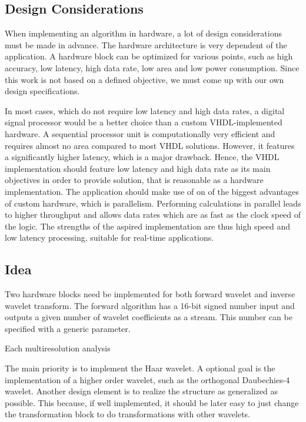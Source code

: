 \begin{refsection}
\subsection{Design Considerations}

When implementing an algorithm in hardware, a lot of design considerations must be made in advance.
The hardware architecture is very dependent of the application.
A hardware block can be optimized for various points, such as high accuracy, low latency, high data rate, low area and low power consumption.
Since this work is not based on a defined objective, we must come up with our own design specifications.

In most cases, which do not require low latency and high data rates, a digital signal processor would be a better choice than a custom VHDL-implemented hardware.
A sequential processor unit is computationally very efficient and requires almost no area compared to most VHDL solutions.
However, it features a significantly higher latency, which is a major drawback.
Hence, the VHDL implementation should feature low latency and high data rate as its main objectives in order to provide solution, that is reasonable as a hardware implementation.
The application should make use of on of the biggest advantages of custom hardware, which is parallelism.
Performing calculations in parallel leads to higher throughput and allows data rates which are as fast as the clock speed of the logic.
The strengths of the aspired implementation are thus high speed and low latency processing, suitable for real-time applications.

\subsection{Idea}

Two hardware blocks need be implemented for both forward wavelet and inverse wavelet transform.
The forward algorithm has a 16-bit signed number input and outputs a given number of wavelet coefficients as a stream.
This number can be specified with a generic parameter.

Each multiresolution analysis 

The main priority is to implement the Haar wavelet.
A optional goal is the implementation of a higher order wavelet, such as the orthogonal Daubechies-4 wavelet.
Another design element is to realize the structure as generalized as possible.
This because, if well implemented, it should be later easy to just change the transformation block to do transformations with other wavelets.



\end{refsection}
